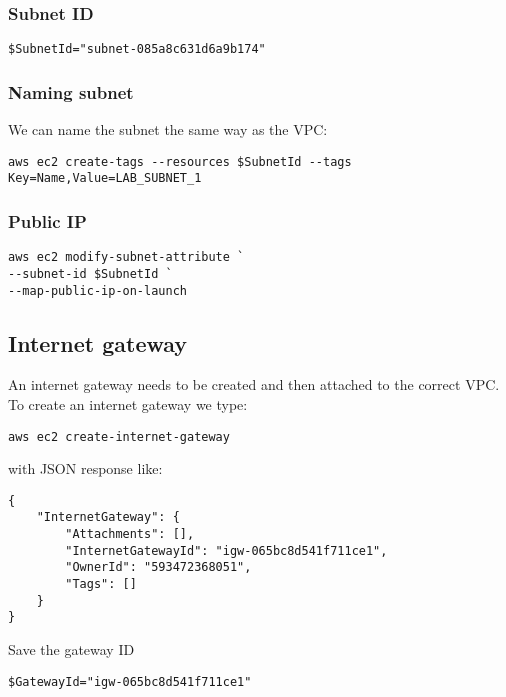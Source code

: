 \documentclass{pgnotes}
\begin{document}
\subsubsection{Subnet ID}

\begin{verbatim}
$SubnetId="subnet-085a8c631d6a9b174"
\end{verbatim}

\subsubsection{Naming subnet}

We can name the subnet the same way as the VPC:

\begin{verbatim}
aws ec2 create-tags --resources $SubnetId --tags Key=Name,Value=LAB_SUBNET_1
\end{verbatim}

\subsubsection{Public IP}

\begin{verbatim}
aws ec2 modify-subnet-attribute `
--subnet-id $SubnetId `
--map-public-ip-on-launch
\end{verbatim}

\subsection{Internet gateway}\label{internet-gateway}

An internet gateway needs to be created and then attached to the correct
VPC. To create an internet gateway we type:

\begin{verbatim}
aws ec2 create-internet-gateway
\end{verbatim}

with JSON response like:

\begin{verbatim}
{
    "InternetGateway": {
        "Attachments": [],
        "InternetGatewayId": "igw-065bc8d541f711ce1",
        "OwnerId": "593472368051",
        "Tags": []
    }
}
\end{verbatim}

Save the gateway ID
\begin{verbatim}
$GatewayId="igw-065bc8d541f711ce1"
\end{verbatim}
\end{document}
